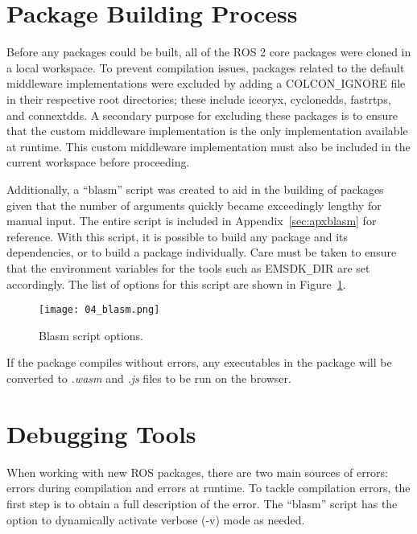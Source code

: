 \section{Package Building Process}

    Before any packages could be built, all of the ROS 2 core packages were cloned in a local workspace. To prevent compilation issues, packages related to the default middleware implementations were excluded by adding a \textsf{COLCON}\texttt{\_}\textsf{IGNORE} file in their respective root directories; these include \textsf{iceoryx}, \textsf{cyclonedds}, \textsf{fastrtps}, and \textsf{connextdds}. A secondary purpose for excluding these packages is to ensure that the custom middleware implementation is the only implementation available at runtime. This custom middleware implementation must also be included in the current workspace before proceeding. 

    Additionally, a ``blasm'' script was created to aid in the building of packages given that the number of arguments quickly became exceedingly lengthy for manual input. The entire script is included in Appendix~\ref{sec:apxblasm} for reference. With this script, it is possible to build any package and its dependencies, or to build a package individually. Care must be taken to ensure that the environment variables for the tools such as \textsf{EMSDK}\texttt{\_}\textsf{DIR} are set accordingly. The list of options for this script are shown in Figure~\ref{fig:blasm}.

    \begin{figure}[htbp]
        \centering
        \texttt{[image: 04\_blasm.png]}
        \caption{Blasm script options.}
        \label{fig:blasm}
    \end{figure}


    If the package compiles without errors, any executables in the package will be converted to \textit{.wasm} and \textit{.js} files to be run on the browser.


\section{Debugging Tools}

    When working with new ROS packages, there are two main sources of errors: errors during compilation and errors at runtime. To tackle compilation errors, the first step is to obtain a full description of the error. The ``blasm'' script has the option to dynamically activate verbose (\textsf{-v}) mode as needed.

